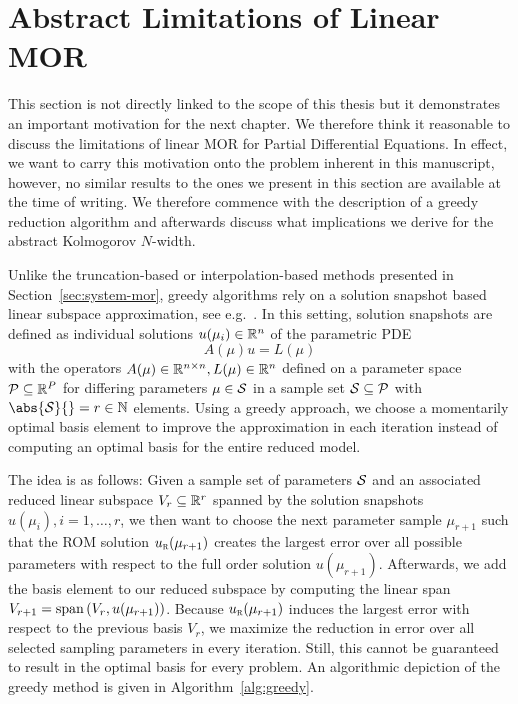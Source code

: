 \section{Abstract Limitations of Linear MOR}\label{sec:limitations-linear-mor}

This section is not directly linked to the scope of this thesis but it demonstrates an important motivation for the next chapter.
We therefore think it reasonable to discuss the limitations of linear MOR for Partial Differential Equations.
In effect, we want to carry this motivation onto the problem inherent in this manuscript, however, no similar results to the ones we present in this section are available at the time of writing.
We therefore commence with the description of a greedy reduction algorithm and afterwards discuss what implications we derive for the abstract Kolmogorov $N$-width.

Unlike the truncation-based or interpolation-based methods presented in Section~\ref{sec:system-mor}, greedy algorithms rely on a solution snapshot based linear subspace approximation, see e.g.~\cite{Grepl2005, Rozza2008, Buffa2012}.
In this setting, solution snapshots are defined as individual solutions $u(\mu_i) \in \mathbb{R}^n$ of the parametric PDE
\begin{equation}\label{eq:parametric-pde}
    A(\mu) u = L(\mu)
\end{equation}
with the operators $A(\mu) \in \mathbb{R}^{n \times n}, L(\mu) \in \mathbb{R}^n$ defined on a parameter space $\mathcal{P} \subseteq \mathbb{R}^P$ for differing parameters $\mu \in \mathcal{S}$ in a sample set $\mathcal{S} \subseteq \mathcal{P}$ with $\abs{\mcl{S}}{} = r \in \bb{N}$ elements.
Using a greedy approach, we choose a momentarily optimal basis element to improve the approximation in each iteration instead of computing an optimal basis for the entire reduced model.

The idea is as follows: Given a sample set of parameters $\mathcal{S}$ and an associated reduced linear subspace $V_r \subseteq \mathbb{R}^r$ spanned by the solution snapshots $u(\mu_i), i = 1, \dots, r$, we then want to choose the next parameter sample $\mu_{r + 1}$ such that the \ac{ROM} solution $u_{\textnormal{\scshape r}}(\mu_{r + 1})$ creates the largest error over all possible parameters with respect to the full order solution $u(\mu_{r + 1})$.
Afterwards, we add the basis element to our reduced subspace by computing the linear span $V_{r + 1} = \mathop{}\!\mathrm{span}\left(V_r, u(\mu_{r + 1})\right)$.
Because $u_{\textnormal{\scshape r}}(\mu_{r + 1})$ induces the largest error with respect to the previous basis $V_r$, we maximize the reduction in error over all selected sampling parameters in every iteration.
Still, this cannot be guaranteed to result in the optimal basis for every problem.
An algorithmic depiction of the greedy method is given in Algorithm~\ref{alg:greedy}.

